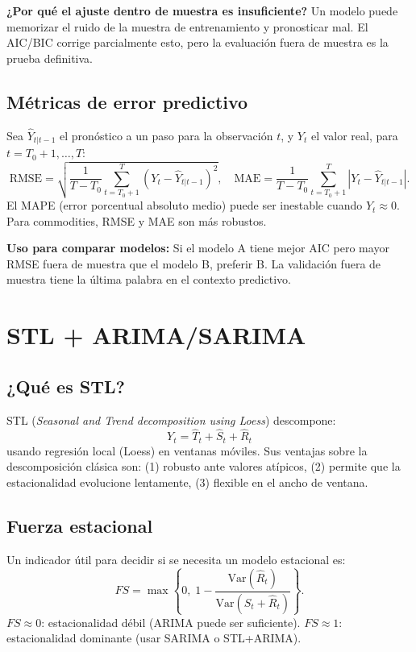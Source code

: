 \documentclass[12pt,a4paper]{article}
\theoremstyle{definition}
\begin{document}
\noindent\textbf{¿Por qué el ajuste dentro de muestra es insuficiente?}
Un modelo puede memorizar el ruido de la muestra de entrenamiento y pronosticar
mal. El AIC/BIC corrige parcialmente esto, pero la evaluación fuera de muestra
es la prueba definitiva.

\subsection{Métricas de error predictivo}

Sea $\hat{Y}_{t|t-1}$ el pronóstico a un paso para la observación $t$, y
$Y_t$ el valor real, para $t = T_0+1, \ldots, T$:
\[
  \text{RMSE} = \sqrt{\frac{1}{T-T_0}\sum_{t=T_0+1}^{T}(Y_t - \hat{Y}_{t|t-1})^2},
  \quad
  \text{MAE} = \frac{1}{T-T_0}\sum_{t=T_0+1}^{T}|Y_t - \hat{Y}_{t|t-1}|.
\]
El MAPE (error porcentual absoluto medio) puede ser inestable cuando $Y_t
\approx 0$. Para commodities, RMSE y MAE son más robustos.

\noindent\textbf{Uso para comparar modelos:} Si el modelo A tiene mejor AIC
pero mayor RMSE fuera de muestra que el modelo B, preferir B. La validación
fuera de muestra tiene la última palabra en el contexto predictivo.

\section{STL + ARIMA/SARIMA}
\label{sec:stl}

\subsection{¿Qué es STL?}

STL (\textit{Seasonal and Trend decomposition using Loess}) descompone:
\[
  Y_t = \hat{T}_t + \hat{S}_t + \hat{R}_t
\]
usando regresión local (Loess) en ventanas móviles. Sus ventajas sobre la
descomposición clásica son: (1) robusto ante valores atípicos, (2) permite que
la estacionalidad evolucione lentamente, (3) flexible en el ancho de ventana.

\subsection{Fuerza estacional}

Un indicador útil para decidir si se necesita un modelo estacional es:
\[
  FS = \max\!\left\{0,\; 1 - \frac{\text{Var}(\hat{R}_t)}{\text{Var}(\hat{S}_t + \hat{R}_t)}\right\}.
\]
$FS \approx 0$: estacionalidad débil (ARIMA puede ser suficiente).
$FS \approx 1$: estacionalidad dominante (usar SARIMA o STL+ARIMA).
\end{document}
